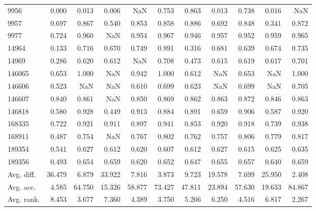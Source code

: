 \begin{tabular}{lrrrrrrrrrr}
9956 & 0.000 & 0.013 & 0.006 & NaN & 0.753 & 0.863 & 0.013 & 0.738 & 0.016 & NaN \\
9957 & 0.697 & 0.867 & 0.540 & 0.853 & 0.858 & 0.886 & 0.692 & 0.848 & 0.341 & 0.872 \\
9977 & 0.724 & 0.960 & NaN & 0.954 & 0.967 & 0.946 & 0.957 & 0.952 & 0.959 & 0.965 \\
14964 & 0.133 & 0.716 & 0.670 & 0.749 & 0.891 & 0.316 & 0.681 & 0.639 & 0.674 & 0.735 \\
14969 & 0.286 & 0.620 & 0.612 & NaN & 0.708 & 0.473 & 0.615 & 0.619 & 0.617 & 0.701 \\
146065 & 0.653 & 1.000 & NaN & 0.942 & 1.000 & 0.612 & NaN & 0.653 & NaN & 1.000 \\
146606 & 0.523 & NaN & NaN & 0.610 & 0.699 & 0.623 & NaN & 0.699 & NaN & 0.705 \\
146607 & 0.840 & 0.861 & NaN & 0.850 & 0.869 & 0.862 & 0.863 & 0.872 & 0.846 & 0.863 \\
146818 & 0.580 & 0.928 & 0.449 & 0.913 & 0.884 & 0.891 & 0.659 & 0.906 & 0.587 & 0.920 \\
168335 & 0.722 & 0.921 & 0.911 & 0.897 & 0.941 & 0.853 & 0.920 & 0.918 & 0.739 & 0.938 \\
168911 & 0.487 & 0.754 & NaN & 0.767 & 0.802 & 0.762 & 0.757 & 0.806 & 0.779 & 0.817 \\
189354 & 0.541 & 0.627 & 0.612 & 0.620 & 0.607 & 0.612 & 0.627 & 0.615 & 0.625 & 0.635 \\
189356 & 0.493 & 0.654 & 0.659 & 0.620 & 0.652 & 0.647 & 0.655 & 0.657 & 0.640 & 0.659 \\
Avg. diff. & 36.479 & 6.879 & 33.922 & 7.816 & 3.873 & 9.723 & 19.578 & 7.699 & 25.950 & 2.408 \\
Avg. acc. & 4.585 & 64.750 & 15.326 & 58.877 & 73.427 & 47.811 & 23.894 & 57.630 & 19.633 & 84.867 \\
Avg. rank. & 8.453 & 3.677 & 7.360 & 4.389 & 3.750 & 5.266 & 6.250 & 4.516 & 6.817 & 2.267 \\
\bottomrule
\end{tabular}
